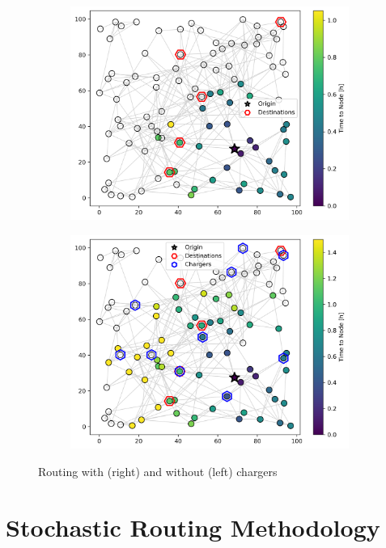 \documentclass[12pt]{article}
\begin{document}
\begin{figure}[H]
	\centering
	\begin{subfigure}{.5\linewidth}
		\centering\includegraphics[width = \linewidth]{figs/routing_without_chargers.png}
	\end{subfigure}%
	\begin{subfigure}{.5\linewidth}
		\centering\includegraphics[width = \linewidth]{figs/routing_with_chargers.png}
	\end{subfigure}
	\caption{Routing with (right) and without (left) chargers}
	\label{fig:routing_chargers}
\end{figure}

\section*{Stochastic Routing Methodology}
\end{document}
